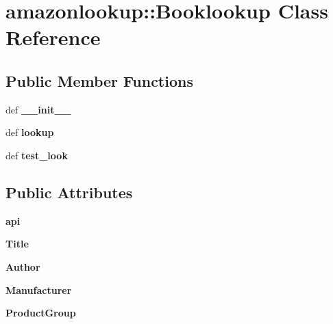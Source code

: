 \hypertarget{classamazonlookup_1_1Booklookup}{
\section{amazonlookup::Booklookup Class Reference}
\label{classamazonlookup_1_1Booklookup}
}
\subsection*{Public Member Functions}
\begin{DoxyCompactItemize}
\item 
\hypertarget{classamazonlookup_1_1Booklookup_a4fb20f2db4573920793d9e1c439983d8}{
def {\bfseries \_\-\_\-init\_\-\_\-}}
\label{classamazonlookup_1_1Booklookup_a4fb20f2db4573920793d9e1c439983d8}

\item 
\hypertarget{classamazonlookup_1_1Booklookup_a7f286ea9179a93889a90dc9ae6d0f598}{
def {\bfseries lookup}}
\label{classamazonlookup_1_1Booklookup_a7f286ea9179a93889a90dc9ae6d0f598}

\item 
\hypertarget{classamazonlookup_1_1Booklookup_aa83f440baea363c7e17052b70900487b}{
def {\bfseries test\_\-look}}
\label{classamazonlookup_1_1Booklookup_aa83f440baea363c7e17052b70900487b}

\end{DoxyCompactItemize}
\subsection*{Public Attributes}
\begin{DoxyCompactItemize}
\item 
\hypertarget{classamazonlookup_1_1Booklookup_a6aac3bccca89b08777120b652bcce298}{
{\bfseries api}}
\label{classamazonlookup_1_1Booklookup_a6aac3bccca89b08777120b652bcce298}

\item 
\hypertarget{classamazonlookup_1_1Booklookup_aec48987ed6ba450d6592e612b6a2576d}{
{\bfseries Title}}
\label{classamazonlookup_1_1Booklookup_aec48987ed6ba450d6592e612b6a2576d}

\item 
\hypertarget{classamazonlookup_1_1Booklookup_ab4cbdde42acc9994ba15ea72526debb2}{
{\bfseries Author}}
\label{classamazonlookup_1_1Booklookup_ab4cbdde42acc9994ba15ea72526debb2}

\item 
\hypertarget{classamazonlookup_1_1Booklookup_a7dfca2ae02f34fb55a07df51180b8e10}{
{\bfseries Manufacturer}}
\label{classamazonlookup_1_1Booklookup_a7dfca2ae02f34fb55a07df51180b8e10}

\item 
\hypertarget{classamazonlookup_1_1Booklookup_ad11edc4ae6a7b036d7252ede00d71b57}{
{\bfseries ProductGroup}}
\label{classamazonlookup_1_1Booklookup_ad11edc4ae6a7b036d7252ede00d71b57}

\end{DoxyCompactItemize}


